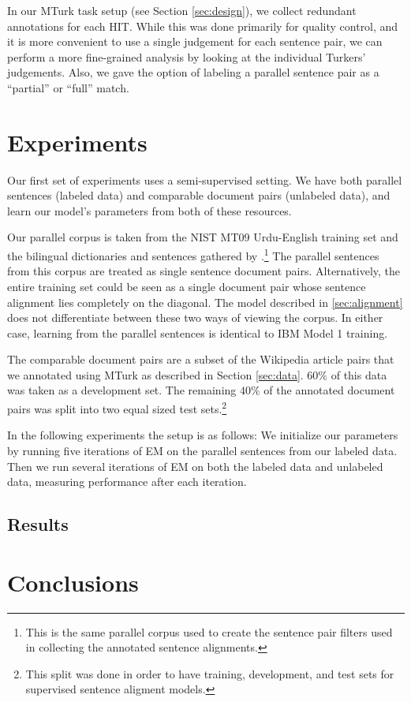 In our MTurk task setup (see Section \ref{sec:design}), we collect redundant
annotations for each HIT. While this was done primarily for quality control, and
it is more convenient to use a single judgement for each sentence pair, we can
perform a more fine-grained analysis by looking at the individual Turkers'
judgements. Also, we gave the option of labeling a parallel sentence pair as a
``partial'' or ``full'' match.


\section{Experiments}
\label{sec:unsup_experiments}
Our first set of experiments uses a semi-supervised setting. We have both
parallel sentences (labeled data) and comparable document pairs (unlabeled data),
and learn our model's parameters from both of these resources.

Our parallel corpus is taken from the NIST MT09 Urdu-English training set
and the bilingual dictionaries and sentences gathered by
\citet{Post12}.\footnote{This is the same parallel corpus used to create the
sentence pair filters used in collecting the annotated sentence alignments.}
The parallel sentences from this corpus are treated as single sentence document
pairs. Alternatively, the entire training set could be seen as a single document
pair whose sentence alignment lies completely on the diagonal. The model
described in \ref{sec:alignment} does not differentiate between these two ways
of viewing the corpus. In either case, learning from the parallel sentences is
identical to IBM Model 1 training.

The comparable document pairs are a subset of the Wikipedia article pairs that
we annotated using MTurk as described in Section \ref{sec:data}. $60\%$ of this
data was taken as a development set. The remaining $40\%$ of the annotated
document pairs was split into two equal sized test sets.\footnote{This split was
done in order to have training, development, and test sets for supervised
sentence aligment models.}

In the following experiments the setup is as follows: We initialize our
parameters by running five iterations of EM on the parallel sentences from our
labeled data. Then we run several iterations of EM on both the labeled data and
unlabeled data, measuring performance after each iteration.

\subsection{Results}

\section{Conclusions}
